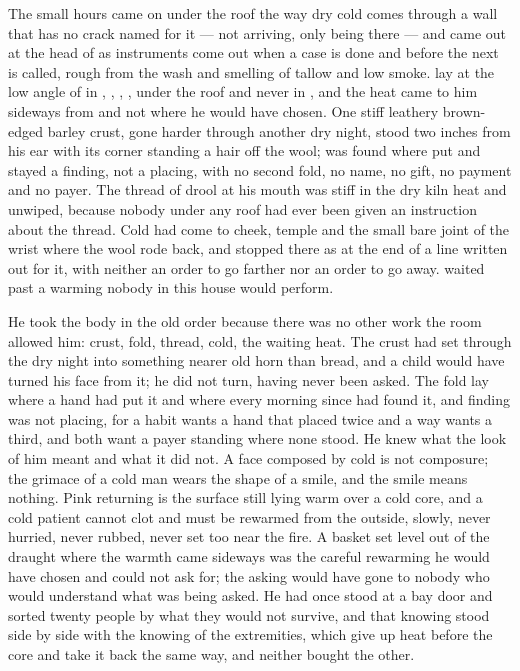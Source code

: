 
The small hours came on under the roof the way dry cold comes through a wall that has no crack named for it --- not arriving, only being there --- and  came out at the head of  as instruments come out when a case is done and before the next is called, rough from the wash and smelling of tallow and low smoke.  lay at the low angle of  in , , , , under the roof and never in , and the heat came to him sideways from  and not where he would have chosen. One stiff leathery brown-edged barley crust, gone harder through another dry night, stood two inches from his ear with its corner standing a hair off the wool;  was found where put and stayed a finding, not a placing, with no second fold, no name, no gift, no payment and no payer. The thread of drool at his mouth was stiff in the dry kiln heat and unwiped, because nobody under any roof had ever been given an instruction about the thread. Cold had come to cheek, temple and the small bare joint of the wrist where the wool rode back, and stopped there as at the end of a line written out for it, with neither an order to go farther nor an order to go away.  waited past a warming nobody in this house would perform.

He took the body in the old order because there was no other work the room allowed him: crust, fold, thread, cold, the waiting heat. The crust had set through the dry night into something nearer old horn than bread, and a child would have turned his face from it; he did not turn, having never been asked. The fold lay where a hand had put it and where every morning since had found it, and finding was not placing, for a habit wants a hand that placed twice and a way wants a third, and both want a payer standing where none stood. He knew what the look of him meant and what it did not. A face composed by cold is not composure; the grimace of a cold man wears the shape of a smile, and the smile means nothing. Pink returning is the surface still lying warm over a cold core, and a cold patient cannot clot and must be rewarmed from the outside, slowly, never hurried, never rubbed, never set too near the fire. A basket set level out of the draught where the warmth came sideways was the careful rewarming he would have chosen and could not ask for; the asking would have gone to nobody who would understand what was being asked. He had once stood at a bay door and sorted twenty people by what they would not survive, and that knowing stood side by side with the knowing of the extremities, which give up heat before the core and take it back the same way, and neither bought the other.

